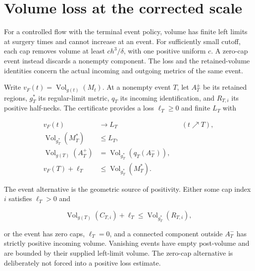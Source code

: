 \section{Volume loss at the corrected scale}
\label{sec:global-volume-loss}

\begin{theorem}
\label{thm:global-volume-loss}
For a controlled flow with the terminal event policy, volume has finite
left limits at surgery times and cannot increase at an event. For sufficiently
small cutoff, each cap removes volume at least $c h^3/\delta$, with one
positive uniform $c$. A zero-cap event instead discards a nonempty component.
The loss and the retained-volume identities concern the actual incoming
and outgoing metrics of the same event.
\end{theorem}

Write $v_F(t)=\operatorname{Vol}_{g(t)}(M_t)$. At a nonempty event $T$,
let $A_T^\pm$ be its retained regions, $g_T^*$ its regular-limit metric,
$q_T$ its incoming identification, and $R_{T,i}$ its positive half-necks.
The certificate provides a loss $\ell_T\geq0$ and finite $L_T$ with

\begin{align}
 v_F(t)&\longrightarrow L_T
   &&(t\nearrow T),\\
 \operatorname{Vol}_{g_T^*}(M_T^*)&\leq L_T,\\
 \operatorname{Vol}_{g(T)}(A_T^+)&=
   \operatorname{Vol}_{g_T^*}(q_T(A_T^-)),\\
 v_F(T)+\ell_T&\leq \operatorname{Vol}_{g_T^*}(M_T^*).
 \label{eq:global-event-volume}
\end{align}

The event alternative is the geometric source of positivity.  Either some
cap index $i$ satisfies $\ell_T>0$ and

\begin{equation}
 \operatorname{Vol}_{g(T)}(C_{T,i})+\ell_T
 \leq \operatorname{Vol}_{g_T^*}(R_{T,i}),
 \label{eq:global-neck-loss}
\end{equation}

or the event has zero caps, $\ell_T=0$, and a connected component outside
$A_T^-$ has strictly positive incoming volume.  Vanishing events have empty
post-volume and are bounded by their supplied left-limit volume.  The
zero-cap alternative is deliberately not forced into a positive loss estimate.

